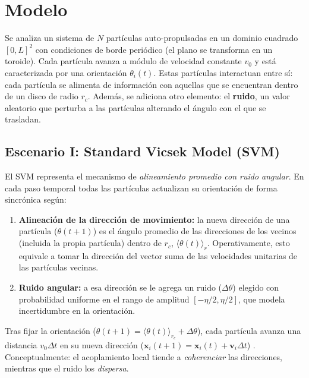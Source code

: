 \documentclass{article}
\begin{document}
\section{Modelo}

Se analiza un sistema de \(N\) partículas auto-propulsadas en un dominio cuadrado \([0,L]^2\) con condiciones de borde periódico (el plano se transforma en un toroide). Cada partícula avanza a módulo de velocidad constante \(v_0\) y está caracterizada por una orientación \(\theta_i(t)\). Estas partículas interactuan entre sí: cada partícula se alimenta de información con aquellas que se encuentran dentro de un disco de radio \(r_c\). Además, se adiciona otro elemento: el \textbf{ruido}, un valor aleatorio que perturba a las partículas alterando el ángulo con el que se trasladan. 

\subsection{Escenario I: Standard Vicsek Model (SVM) \cite{vicsek1995}}
El SVM representa el mecanismo de \emph{alineamiento promedio con ruido angular}. En cada paso temporal todas las partículas actualizan su orientación de forma sincrónica según:
\begin{enumerate}
  \item \textbf{Alineación de la dirección de movimiento:} la nueva dirección de una partícula (\(\theta(t+1)\)) es el ángulo promedio de las direcciones de los vecinos (incluida la propia partícula) dentro de \(r_c\), \(\langle\theta(t)\rangle_r\). Operativamente, esto equivale a tomar la dirección del vector suma de las velocidades unitarias de las partículas vecinas.
  \item \textbf{Ruido angular:} a esa dirección se le agrega un ruido (\(\Delta \theta\)) elegido con probabilidad uniforme en el rango de amplitud \([-\eta/2, \eta/2]\), que modela incertidumbre en la orientación.
\end{enumerate}
Tras fijar la orientación (\(\theta(t+1)= \langle\theta(t)\rangle_{r_c} + \Delta \theta\)), cada partícula avanza una distancia \(v_0\Delta t\) en su nueva dirección (\(\mathbf x_i(t+1) = \mathbf x_i(t) + \mathbf v_i\Delta t\)) . Conceptualmente: el acoplamiento local tiende a \emph{coherenciar} las direcciones, mientras que el ruido los \emph{dispersa}. 
\end{document}
